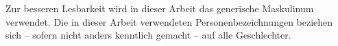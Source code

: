Zur besseren Lesbarkeit wird in dieser Arbeit das generische Maskulinum verwendet. Die in dieser Arbeit verwendeten Personenbezeichnungen beziehen sich – sofern nicht anders kenntlich gemacht – auf alle Geschlechter.